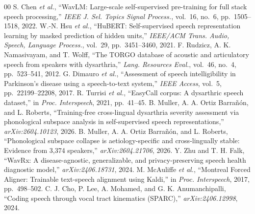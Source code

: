 \documentclass[conference]{IEEEtran}
\begin{document}
\begin{thebibliography}{00}
 S. Chen \emph{et al.}, ``WavLM: Large-scale self-supervised pre-training for full stack speech processing,'' \emph{IEEE J. Sel. Topics Signal Process.}, vol.~16, no.~6, pp.~1505--1518, 2022.
 W.-N. Hsu \emph{et al.}, ``HuBERT: Self-supervised speech representation learning by masked prediction of hidden units,'' \emph{IEEE/ACM Trans. Audio, Speech, Language Process.}, vol.~29, pp.~3451--3460, 2021.
 F. Rudzicz, A. K. Namasivayam, and T. Wolff, ``The TORGO database of acoustic and articulatory speech from speakers with dysarthria,'' \emph{Lang. Resources Eval.}, vol.~46, no.~4, pp.~523--541, 2012.
 G. Dimauro \emph{et al.}, ``Assessment of speech intelligibility in Parkinson's disease using a speech-to-text system,'' \emph{IEEE Access}, vol.~5, pp.~22199--22208, 2017.
 R. Turrisi \emph{et al.}, ``EasyCall corpus: A dysarthric speech dataset,'' in \emph{Proc. Interspeech}, 2021, pp.~41--45.
 B. Muller, A. A. Ortiz Barra\~n\'on, and L. Roberts, ``Training-free cross-lingual dysarthria severity assessment via phonological subspace analysis in self-supervised speech representations,'' \emph{arXiv:2604.10123}, 2026.
 B. Muller, A. A. Ortiz Barra\~n\'on, and L. Roberts, ``Phonological subspace collapse is aetiology-specific and cross-lingually stable: Evidence from 3,374 speakers,'' \emph{arXiv:2604.21706}, 2026.
 Y. Zhu and T. H. Falk, ``WavRx: A disease-agnostic, generalizable, and privacy-preserving speech health diagnostic model,'' \emph{arXiv:2406.18731}, 2024.
 M. McAuliffe \emph{et al.}, ``Montreal Forced Aligner: Trainable text-speech alignment using Kaldi,'' in \emph{Proc. Interspeech}, 2017, pp.~498--502.
 C. J. Cho, P. Lee, A. Mohamed, and G. K. Anumanchipalli, ``Coding speech through vocal tract kinematics (SPARC),'' \emph{arXiv:2406.12998}, 2024.
\end{thebibliography}
\end{document}
